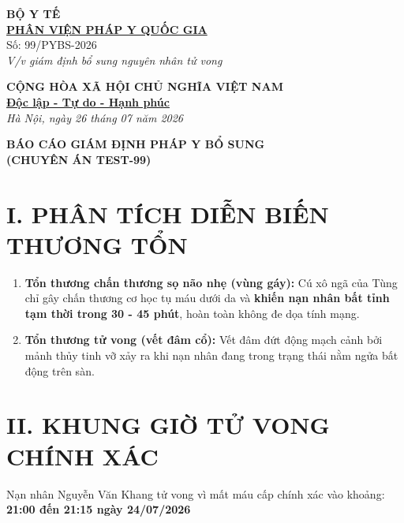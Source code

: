 \documentclass[12pt,a4paper]{article}
\begin{document}
\noindent
\begin{minipage}[t]{0.45\textwidth}
    \begin{center}
        \textbf{BỘ Y TẾ}\\
        \textbf{\underline{PHÂN VIỆN PHÁP Y QUỐC GIA}}\\[0.2cm]
        \small{Số: 99/PYBS-2026}\\
        \textit{V/v giám định bổ sung nguyên nhân tử vong}
    \end{center}
\end{minipage}
\hfill
\begin{minipage}[t]{0.52\textwidth}
    \begin{center}
        \textbf{CỘNG HÒA XÃ HỘI CHỦ NGHĨA VIỆT NAM}\\
        \textbf{\underline{Độc lập - Tự do - Hạnh phúc}}\\[0.2cm]
        \textit{Hà Nội, ngày 26 tháng 07 năm 2026}
    \end{center}
\end{minipage}

\vspace{0.8cm}

\begin{center}
    \textbf{\LARGE BÁO CÁO GIÁM ĐỊNH PHÁP Y BỔ SUNG}\\
    \textbf{\large (CHUYÊN ÁN TEST-99)}
\end{center}

\vspace{0.3cm}

\section*{I. PHÂN TÍCH DIỄN BIẾN THƯƠNG TỔN}
\begin{enumerate}
    \item \textbf{Tổn thương chấn thương sọ não nhẹ (vùng gáy):} Cú xô ngã của Tùng chỉ gây chấn thương cơ học tụ máu dưới da và \textbf{khiến nạn nhân bất tỉnh tạm thời trong 30 - 45 phút}, hoàn toàn không đe dọa tính mạng.
    \item \textbf{Tổn thương tử vong (vết đâm cổ):} Vết đâm đứt động mạch cảnh bởi mảnh thủy tinh vỡ xảy ra khi nạn nhân đang trong trạng thái nằm ngửa bất động trên sàn.
\end{enumerate}

\section*{II. KHUNG GIỜ TỬ VONG CHÍNH XÁC}
\begin{tcolorbox}[colback=red!10!white,colframe=red!75!black,title=\textbf{KẾT LUẬN KHUNG GIỜ TỬ VONG CHÍNH XÁC}]
\begin{center}
    Nạn nhân Nguyễn Văn Khang tử vong vì mất máu cấp chính xác vào khoảng:\\
    \textbf{\Large 21:00 đến 21:15 ngày 24/07/2026}
\end{center}
\end{tcolorbox}
\end{document}
